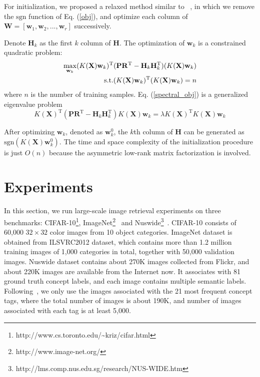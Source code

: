 \documentclass[conference]{IEEEtran}
\begin{document}
For initialization, we proposed a relaxed method similar to ~\cite{liu2012supervised}, in which we remove the $\mathrm{sgn}$ function of Eq. (\ref{obj}), and optimize each column of $\mathbf{W} = [\mathbf{w}_1,\mathbf{w}_2,...,\mathbf{w}_r]$ successively.

Denote $\mathbf{H}_k$ as the first $k$ column of $\mathbf{H}$. The optimization of $\mathbf{w}_k$ is a constrained quadratic problem:
\begin{equation}
\setlength{\abovedisplayskip}{3pt}
\setlength{\belowdisplayskip}{3pt}
\begin{split}
\max_{\mathbf{w}_k} (K(\mathbf{X}) \mathbf{w}_k)^{\mathrm{T}} (\mathbf{P}\mathbf{R}^\mathrm{T} - \mathbf{H}_k \mathbf{H}_k ^{\mathrm{T}})(K(\mathbf{X}) \mathbf{w}_k) \\
\mathrm{s.t.} (K(\mathbf{X}) \mathbf{w}_k)^{\mathrm{T}} (K(\mathbf{X}) \mathbf{w}_k) = n
\end{split}
\label{spectral_obj}
\end{equation}
where $n$ is the number of training samples. Eq. (\ref{spectral_obj}) is a generalized eigenvalue problem
\begin{equation}
K(\mathbf{X})^\mathrm{T}(\mathbf{P}\mathbf{R}^\mathrm{T} - \mathbf{H}_k \mathbf{H}_k ^{\mathrm{T}})K(\mathbf{X}) \mathbf{w}_k = \lambda K(\mathbf{X})^\mathrm{T}K(\mathbf{X}) \mathbf{w}_k
\label{eigen_obj}
\end{equation}

After optimizing $\mathbf{w}_k$, denoted as $\mathbf{w}_k^0$, the $k$th column of $\mathbf{H}$ can be generated as $\mathrm{sgn}(K(\mathbf{X}) \mathbf{w}_k^0)$. The time and space complexity of the initialization procedure is just $O(n)$ because the asymmetric low-rank matrix factorization is involved.

\section{Experiments}
\label{sec:exp}

In this section, we run large-scale image retrieval experiments on three benchmarks: CIFAR-10\footnote{http://www.cs.toronto.edu/\textasciitilde kriz/cifar.html}, ImageNet\footnote{http://www.image-net.org/}~\cite{deng2009imagenet} and Nuswide\footnote{http://lms.comp.nus.edu.sg/research/NUS-WIDE.htm}~\cite{chua2009nus}. CIFAR-10 consists of 60,000 $32 \times 32$ color images from 10 object categories. ImageNet dataset is obtained from ILSVRC2012 dataset, which contains more than 1.2 million training images of 1,000 categories in total, together with 50,000 validation images. Nuswide dataset contains about 270K images collected from Flickr, and about 220K images are available from the Internet now. It associates with 81 ground truth concept labels, and each image contains multiple semantic labels. Following~\cite{liu2011hashing}, we only use the images associated with the 21 most frequent concept tags, where the total number of images is about 190K, and number of images associated with each tag is at least 5,000. 
\end{document}
